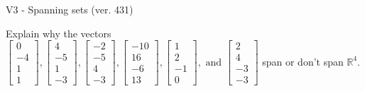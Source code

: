 \begin{exercise}
  \begin{exerciseTitle}V3 - Spanning sets (ver. 431)\end{exerciseTitle}
  \begin{exerciseStatement}
    Explain why the vectors \(\left[\begin{array}{r}
0 \\
-4 \\
1 \\
1
\end{array}\right] , \left[\begin{array}{r}
4 \\
-5 \\
1 \\
-3
\end{array}\right] , \left[\begin{array}{r}
-2 \\
-5 \\
4 \\
-3
\end{array}\right] , \left[\begin{array}{r}
-10 \\
16 \\
-6 \\
13
\end{array}\right] , \left[\begin{array}{r}
1 \\
2 \\
-1 \\
0
\end{array}\right] , \text{ and } \left[\begin{array}{r}
2 \\
4 \\
-3 \\
-3
\end{array}\right]\) span or don't span \(\mathbb{R}^4\). 
	



\end{exerciseStatement}
\end{exercise}
